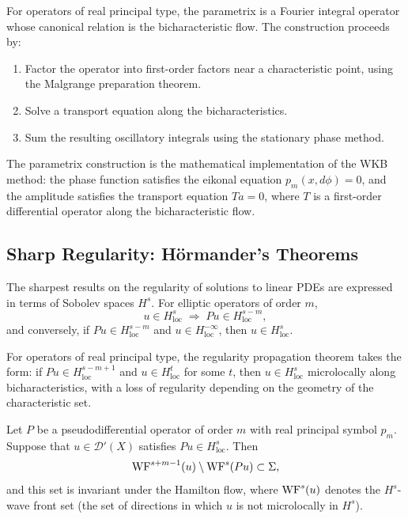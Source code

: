 For operators of real principal type, the parametrix is a Fourier
integral operator whose canonical relation is the bicharacteristic
flow. The construction proceeds by:

\begin{enumerate}
\item Factor the operator into first-order factors near a characteristic
point, using the Malgrange preparation theorem.
\item Solve a transport equation along the bicharacteristics.
\item Sum the resulting oscillatory integrals using the stationary
phase method.
\end{enumerate}

The parametrix construction is the mathematical implementation of the
WKB method: the phase function satisfies the eikonal equation
\(p_m(x, d\phi) = 0\), and the amplitude satisfies the transport
equation \(T a = 0\), where \(T\) is a first-order differential operator
along the bicharacteristic flow.

\subsection{Sharp Regularity: H\"ormander's Theorems}

The sharpest results on the regularity of solutions to linear PDEs are
expressed in terms of Sobolev spaces \(H^s\). For elliptic operators of
order \(m\),
\[
u \in H^s_{\text{loc}} \;\Longrightarrow\; Pu \in H^{s-m}_{\text{loc}},
\]
and conversely, if \(Pu \in H^{s-m}_{\text{loc}}\) and \(u \in
H^{-\infty}_{\text{loc}}\), then \(u \in H^{s}_{\text{loc}}\).

For operators of real principal type, the regularity propagation
theorem takes the form: if \(Pu \in H^{s-m+1}_{\text{loc}}\) and
\(u \in H^t_{\text{loc}}\) for some \(t\), then
\(u \in H^{s}_{\text{loc}}\) microlocally along bicharacteristics, with
a loss of regularity depending on the geometry of the characteristic
set.

\begin{theorem}
Let \(P\) be a pseudodifferential operator of order \(m\) with real
principal symbol \(p_m\). Suppose that \(u \in \mathcal{D}'(X)\)
satisfies \(Pu \in H^{s}_{\text{loc}}\). Then
\[
\operatorname{WF}^{s+m-1}(u) \setminus \operatorname{WF}^{s}(Pu) \subset \Sigma,
\]
and this set is invariant under the Hamilton flow,
where \(\operatorname{WF}^{s}(u)\) denotes the \(H^s\)-wave front set (the set of
directions in which \(u\) is not microlocally in \(H^s\)).
\end{theorem}

